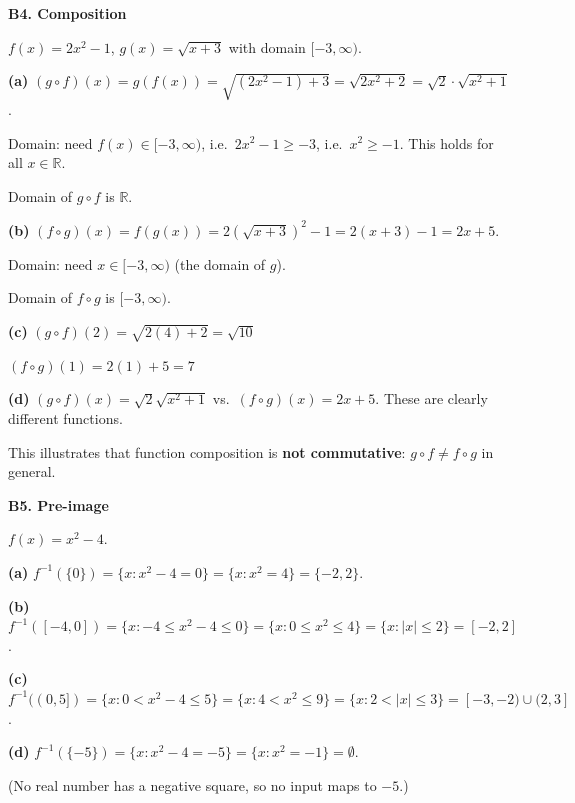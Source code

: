 \documentclass[12pt, a4paper]{article}
\theoremstyle{definition}
\newcommand{\R}{\mathbb{R}}
\begin{document}
\begin{solbox}
\textbf{B4. Composition}

$f(x)=2x^2-1$, $g(x)=\sqrt{x+3}$ with domain $[-3,\infty)$.

\textbf{(a)} $(g\circ f)(x)=g(f(x))=\sqrt{(2x^2-1)+3}=\sqrt{2x^2+2}=\sqrt{2}\cdot\sqrt{x^2+1}$.

Domain: need $f(x)\in[-3,\infty)$, i.e.\ $2x^2-1\geq -3$, i.e.\ $x^2\geq -1$. This holds for all $x\in\R$.

Domain of $g\circ f$ is $\R$.

\textbf{(b)} $(f\circ g)(x)=f(g(x))=2(\sqrt{x+3})^2-1=2(x+3)-1=2x+5$.

Domain: need $x\in[-3,\infty)$ (the domain of $g$).

Domain of $f\circ g$ is $[-3,\infty)$.

\textbf{(c)} $(g\circ f)(2)=\sqrt{2(4)+2}=\sqrt{10}$

$(f\circ g)(1)=2(1)+5=7$

\textbf{(d)} $(g\circ f)(x)=\sqrt{2}\sqrt{x^2+1}$ vs.\ $(f\circ g)(x)=2x+5$. These are clearly different functions.

This illustrates that function composition is \textbf{not commutative}: $g\circ f\neq f\circ g$ in general.
\end{solbox}

\begin{solbox}
\textbf{B5. Pre-image}

$f(x)=x^2-4$.

\textbf{(a)} $f^{-1}(\{0\})=\{x:x^2-4=0\}=\{x:x^2=4\}=\{-2,2\}$.

\textbf{(b)} $f^{-1}([-4,0])=\{x:-4\leq x^2-4\leq 0\}=\{x:0\leq x^2\leq 4\}=\{x:|x|\leq 2\}=[-2,2]$.

\textbf{(c)} $f^{-1}((0,5])=\{x:0<x^2-4\leq 5\}=\{x:4<x^2\leq 9\}=\{x:2<|x|\leq 3\}=[-3,-2)\cup(2,3]$.

\textbf{(d)} $f^{-1}(\{-5\})=\{x:x^2-4=-5\}=\{x:x^2=-1\}=\emptyset$.

(No real number has a negative square, so no input maps to $-5$.)
\end{solbox}
\end{document}
